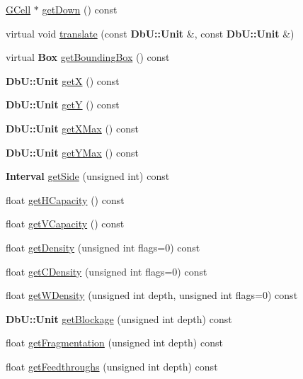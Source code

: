 \begin{DoxyCompactItemize}
\item 
\hyperlink{classKatabatic_1_1GCell}{G\-Cell} $\ast$ \hyperlink{classKatabatic_1_1GCell_a303e94e8090f008b434e785af9a34eb5}{get\-Down} () const 
\item 
virtual void \hyperlink{classKatabatic_1_1GCell_a819f3ffbba69e4de2a19c827676b5aee}{translate} (const {\bf Db\-U\-::\-Unit} \&, const {\bf Db\-U\-::\-Unit} \&)
\item 
virtual {\bf Box} \hyperlink{classKatabatic_1_1GCell_a3b9694bf093e3ea16e4a8c8126a8d4db}{get\-Bounding\-Box} () const 
\item 
{\bf Db\-U\-::\-Unit} \hyperlink{classKatabatic_1_1GCell_a852afe759ce2cb8cb9c0524fc1e23387}{get\-X} () const 
\item 
{\bf Db\-U\-::\-Unit} \hyperlink{classKatabatic_1_1GCell_ac597d25a34a79fb4393211c70f5a1bc3}{get\-Y} () const 
\item 
{\bf Db\-U\-::\-Unit} \hyperlink{classKatabatic_1_1GCell_ae58d4705ca2370ad5e0912d9e92e94da}{get\-X\-Max} () const 
\item 
{\bf Db\-U\-::\-Unit} \hyperlink{classKatabatic_1_1GCell_a98f8c479d4789850a926d87443e56e00}{get\-Y\-Max} () const 
\item 
{\bf Interval} \hyperlink{classKatabatic_1_1GCell_a46861e2e666df89cd2e6eaa7ee146bcf}{get\-Side} (unsigned int) const 
\item 
float \hyperlink{classKatabatic_1_1GCell_a75e5f7e9b993087270e8b21eb1e71e8d}{get\-H\-Capacity} () const 
\item 
float \hyperlink{classKatabatic_1_1GCell_a4f58e38dbcd75ae549f3ce9526ce97e1}{get\-V\-Capacity} () const 
\item 
float \hyperlink{classKatabatic_1_1GCell_abdc872b796225ad9d6414f59b6d503c1}{get\-Density} (unsigned int flags=0) const 
\item 
float \hyperlink{classKatabatic_1_1GCell_a35c9f813f00788d8093faa5c37c846e3}{get\-C\-Density} (unsigned int flags=0) const 
\item 
float \hyperlink{classKatabatic_1_1GCell_acfacab8f1d78e38ece30b4d2c63cf6d9}{get\-W\-Density} (unsigned int depth, unsigned int flags=0) const 
\item 
{\bf Db\-U\-::\-Unit} \hyperlink{classKatabatic_1_1GCell_a3cd78c51e165f5242bb99ab5033ff871}{get\-Blockage} (unsigned int depth) const 
\item 
float \hyperlink{classKatabatic_1_1GCell_ab154601770f4c29260c19364f130d534}{get\-Fragmentation} (unsigned int depth) const 
\item 
float \hyperlink{classKatabatic_1_1GCell_a1b246f4d67f6a21d391d2f366d184092}{get\-Feedthroughs} (unsigned int depth) const 

\end{DoxyCompactItemize}
